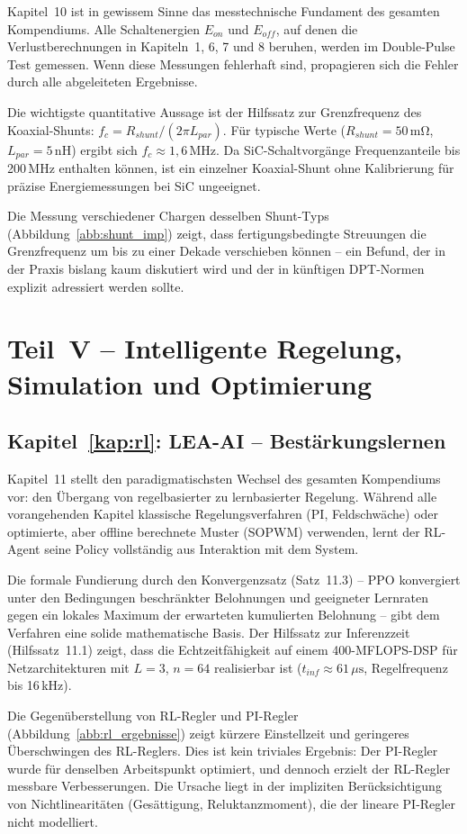 ﻿\documentclass[a4paper,12pt,openany,oneside]{book}
\newcommand{\abschnitt}[1]{\section{#1}}
\newcommand{\unterabschnitt}[1]{\subsection{#1}}
\theoremstyle{definition}
\begin{document}
Kapitel~10 ist in gewissem Sinne das messtechnische Fundament des gesamten Kompendiums.
Alle Schaltenergien $E_{on}$ und $E_{off}$, auf denen die Verlustberechnungen in
Kapiteln~1, 6, 7 und 8 beruhen, werden im Double-Pulse Test gemessen. Wenn diese
Messungen fehlerhaft sind, propagieren sich die Fehler durch alle abgeleiteten Ergebnisse.

Die wichtigste quantitative Aussage ist der Hilfssatz zur Grenzfrequenz des Koaxial-Shunts:
$f_c = R_{shunt}/(2\pi L_{par})$. F\"ur typische Werte ($R_{shunt} = 50\,\mathrm{m\Omega}$,
$L_{par} = 5\,\mathrm{nH}$) ergibt sich $f_c \approx 1{,}6\,\mathrm{MHz}$. Da
SiC-Schaltvorg\"ange Frequenzanteile bis 200\,MHz enthalten k\"onnen, ist ein einzelner
Koaxial-Shunt ohne Kalibrierung f\"ur pr\"azise Energiemessungen bei SiC ungeeignet.

Die Messung verschiedener Chargen desselben Shunt-Typs (Abbildung~\ref{abb:shunt_imp})
zeigt, dass fertigungsbedingte Streuungen die Grenzfrequenz um bis zu einer Dekade
verschieben k\"onnen -- ein Befund, der in der Praxis bislang kaum diskutiert wird
und der in k\"unftigen DPT-Normen explizit adressiert werden sollte.

\abschnitt{Teil~V -- Intelligente Regelung, Simulation und Optimierung}

\unterabschnitt{Kapitel~\ref{kap:rl}: LEA-AI -- Best\"arkungslernen}

Kapitel~11 stellt den paradigmatischsten Wechsel des gesamten Kompendiums vor: den
\"Ubergang von regelbasierter zu lernbasierter Regelung. W\"ahrend alle vorangehenden
Kapitel klassische Regelungsverfahren (PI, Feldschwäche) oder optimierte, aber offline
berechnete Muster (SOPWM) verwenden, lernt der RL-Agent seine Policy vollst\"andig
aus Interaktion mit dem System.

Die formale Fundierung durch den Konvergenzsatz (Satz~11.3) -- PPO konvergiert
unter den Bedingungen beschr\"ankter Belohnungen und geeigneter Lernraten gegen
ein lokales Maximum der erwarteten kumulierten Belohnung -- gibt dem Verfahren eine
solide mathematische Basis. Der Hilfssatz zur Inferenzzeit (Hilfssatz~11.1) zeigt,
dass die Echtzeitf\"ahigkeit auf einem 400-MFLOPS-DSP f\"ur Netzarchitekturen mit
$L = 3$, $n = 64$ realisierbar ist ($t_{inf} \approx 61\,\mu\mathrm{s}$,
Regelfrequenz bis 16\,kHz).

Die Gegen\"uberstellung von RL-Regler und PI-Regler (Abbildung~\ref{abb:rl_ergebnisse})
zeigt k\"urzere Einstellzeit und geringeres \"Uberschwingen des RL-Reglers. Dies ist
kein triviales Ergebnis: Der PI-Regler wurde f\"ur denselben Arbeitspunkt optimiert,
und dennoch erzielt der RL-Regler messbare Verbesserungen. Die Ursache liegt in der
impliziten Ber\"ucksichtigung von Nichtlinearit\"aten (Ges\"attigung, Reluktanzmoment),
die der lineare PI-Regler nicht modelliert.
\end{document}
